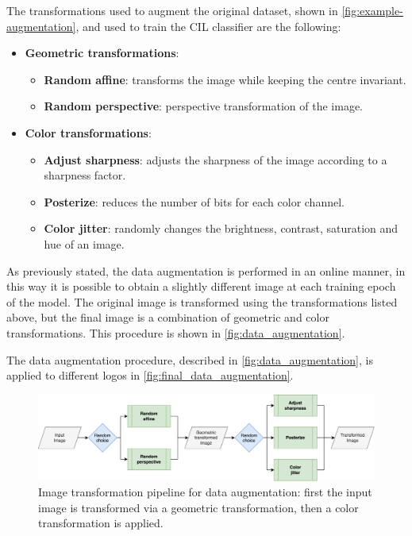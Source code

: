 The transformations used to augment the original dataset, shown in \autoref{fig:example-augmentation}, and used to train the CIL classifier are the following:
\begin{itemize}
    \item \textbf{Geometric transformations}:
    \begin{itemize}
        \item \textbf{Random affine}: transforms the image while keeping the centre invariant.
        \item \textbf{Random perspective}: perspective transformation of the image.
    \end{itemize}
    \item \textbf{Color transformations}:
    \begin{itemize}
        \item \textbf{Adjust sharpness}: adjusts the sharpness of the image according to a sharpness factor.
        \item \textbf{Posterize}: reduces the number of bits for each color channel.
        \item \textbf{Color jitter}: randomly changes the brightness, contrast, saturation and hue of an image.
    \end{itemize}
\end{itemize}

As previously stated, the data augmentation is performed in an online manner, in this way it is possible to obtain a slightly different image at each training epoch of the model.
The original image is transformed using the transformations listed above, but the final image is a combination of geometric and color transformations. 
This procedure is shown in \autoref{fig:data_augmentation}.

The data augmentation procedure, described in \autoref{fig:data_augmentation}, is applied to different logos in \autoref{fig:final_data_augmentation}.

\begin{figure}%
	\centering

    \begin{center}
        \includegraphics[width=\columnwidth]{images/data_augmentation.drawio.png}
    \end{center}

	\caption{Image transformation pipeline for data augmentation: first the input image is transformed via a geometric transformation, then a color transformation is applied.}%
	\label{fig:data_augmentation}%
\end{figure}

